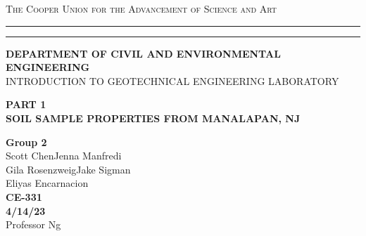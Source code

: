 \begin{titlepage}
    \begin{center}
    {{\Large{\textsc{The Cooper Union for the Advancement of Science and Art}}}} \rule[0.1cm]{15.8cm}{0.1mm}
    \rule[0.5cm]{15.8cm}{0.6mm}
    {\small{\bf DEPARTMENT OF CIVIL AND ENVIRONMENTAL ENGINEERING}}\\
    {\footnotesize{INTRODUCTION TO GEOTECHNICAL ENGINEERING LABORATORY}}
    \end{center}
    \vspace{15mm}
    \begin{center}
    {\large{\bf PART 1\\}}
    \vspace{5mm}
    {\Large{\bf SOIL SAMPLE PROPERTIES FROM MANALAPAN, NJ}}
    \end{center}
    \vspace{35mm}
    \par
    \noindent
    \hfill
    \vspace{20mm}
    \begin{center}
    {\large{\bf {Group 2\\}}}
    {\large{ { Scott Chen\hspace{5mm}Jenna Manfredi\\Gila Rosenzweig\hspace{5mm}Jake Sigman\\Eliyas Encarnacion}}}
    \vspace{40mm}
    {\large {\bf \\CE-331 \\ 4/14/23 \\}}
    \vspace{15mm}
    {\normalsize{Professor Ng}}
    \end{center}
\end{titlepage}